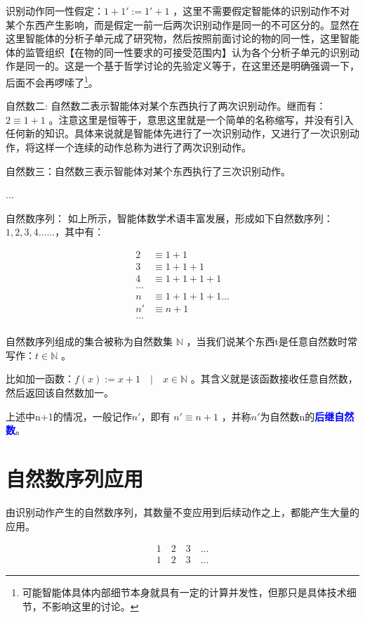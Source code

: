 \documentclass[12pt,oneside]{book}
\renewcommand{\emph}[1]{\textcolor{blue}{\textbf{#1}}}
\begin{document}
识别动作同一性假定：$1+1' := 1'+1$ ，这里不需要假定智能体的识别动作不对某个东西产生影响，而是假定一前一后两次识别动作是同一的不可区分的。显然在这里智能体的分析子单元成了研究物，然后按照前面讨论的物的同一性，这里智能体的监管组织【在物的同一性要求的可接受范围内】认为各个分析子单元的识别动作是同一的。这是一个基于哲学讨论的先验定义等于，在这里还是明确强调一下，后面不会再啰嗦了\footnote{可能智能体具体内部细节本身就具有一定的计算并发性，但那只是具体技术细节，不影响这里的讨论。}。

自然数二:  自然数二表示智能体对某个东西执行了两次识别动作。继而有：$2 \equiv 1 + 1$ 。注意这里是恒等于，意思这里就是一个简单的名称缩写，并没有引入任何新的知识。具体来说就是智能体先进行了一次识别动作，又进行了一次识别动作，将这样一个连续的动作总称为进行了两次识别动作。

自然数三：自然数三表示智能体对某个东西执行了三次识别动作。

...

自然数序列： 如上所示，智能体数学术语丰富发展，形成如下自然数序列： $1, 2, 3, 4 ......$，其中有：


\begin{align*}
2 &\equiv 1 + 1 \\
3 &\equiv 1 + 1 + 1 \\
4 &\equiv 1 + 1 + 1 + 1 \\
...\\
n &\equiv 1 + 1 + 1 + 1 ...\\
n' &\equiv n + 1\\
...\\
\end{align*}


自然数序列组成的集合被称为自然数集 $ \mathbb{N} $ ，当我们说某个东西t是任意自然数时常写作：$ t \in \mathbb{N} $ 。

比如加一函数：$f(x) := x +1 \quad | \quad  x \in \mathbb{N} $ 。其含义就是该函数接收任意自然数，然后返回该自然数加一。

上述中n+1的情况，一般记作$n'$，即有 $n'\equiv n+1$ ，并称$n'$为自然数n的\emph{后继自然数}。


\section{自然数序列应用}
由识别动作产生的自然数序列，其数量不变应用到后续动作之上，都能产生大量的应用。

\begin{align*}
1 \quad 2  \quad 3 \quad ... \\
1 \quad 2  \quad 3 \quad ...
\end{align*}
\end{document}
